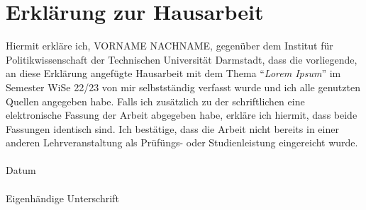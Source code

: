 \begin{doublespace}
\pagebreak

\pagebreak
\end{doublespace}
\printglossary[type=\acronymtype,title={Abkürzungsverzeichnis},nonumberlist]
\pagebreak
\section*{Erklärung zur Hausarbeit}
\begin{changemargin}{0.5cm}{0.5cm}
Hiermit erkläre ich, VORNAME NACHNAME, gegenüber dem Institut für Politikwissenschaft der Technischen Universität Darmstadt, dass die vorliegende, an diese Erklärung angefügte Hausarbeit mit dem Thema \enquote{\textit{Lorem Ipsum}} im Semester WiSe 22/23 von mir selbstständig verfasst wurde und ich alle genutzten Quellen angegeben habe. Falls ich zusätzlich zu der schriftlichen eine elektronische Fassung der Arbeit abgegeben habe, erkläre ich hiermit, dass beide Fassungen identisch sind. Ich bestätige, dass die Arbeit nicht bereits in einer anderen Lehrveranstaltung als Prüfüngs- oder Studienleistung eingereicht wurde.\\
\\
Datum \\
\\
Eigenhändige Unterschrift

\end{changemargin}